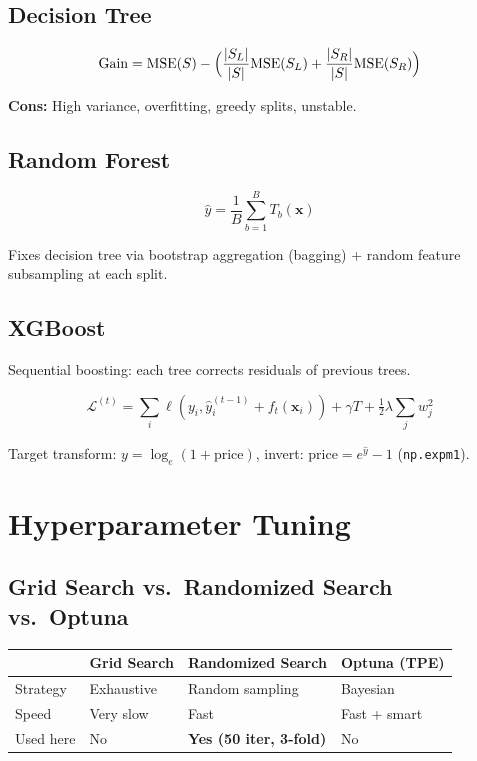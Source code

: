 \documentclass[12pt,a4paper]{article}
\begin{document}
\subsection{Decision Tree}
\begin{formulabox}
\[\text{Gain}=\text{MSE}(S)-\Bigl(\frac{|S_L|}{|S|}\text{MSE}(S_L)+\frac{|S_R|}{|S|}\text{MSE}(S_R)\Bigr)\]
\end{formulabox}
\textbf{Cons:} High variance, overfitting, greedy splits, unstable.

\subsection{Random Forest}
\begin{formulabox}[Prediction]
\[\hat{y}=\frac{1}{B}\sum_{b=1}^{B}T_b(\mathbf{x})\]
\end{formulabox}
Fixes decision tree via bootstrap aggregation (bagging) + random feature subsampling at each split.

\subsection{XGBoost}
Sequential boosting: each tree corrects residuals of previous trees.
\begin{formulabox}[Objective]
\[\mathcal{L}^{(t)}=\sum_i\ell\!\left(y_i,\hat{y}_i^{(t-1)}+f_t(\mathbf{x}_i)\right)+\gamma T+\tfrac{1}{2}\lambda\sum_j w_j^2\]
\end{formulabox}
Target transform: $y=\log_e(1+\text{price})$, invert: $\text{price}=e^{\hat{y}}-1$ (\texttt{np.expm1}).

\section{Hyperparameter Tuning}

\subsection{Grid Search vs.\ Randomized Search vs.\ Optuna}
\begin{center}
\begin{tabular}{llll}\toprule
  & Grid Search & Randomized Search & Optuna (TPE)\\\midrule
  Strategy & Exhaustive & Random sampling & Bayesian\\
  Speed & Very slow & Fast & Fast + smart\\
  Used here & No & \textbf{Yes (50 iter, 3-fold)} & No\\\bottomrule
\end{tabular}
\end{center}
\end{document}
